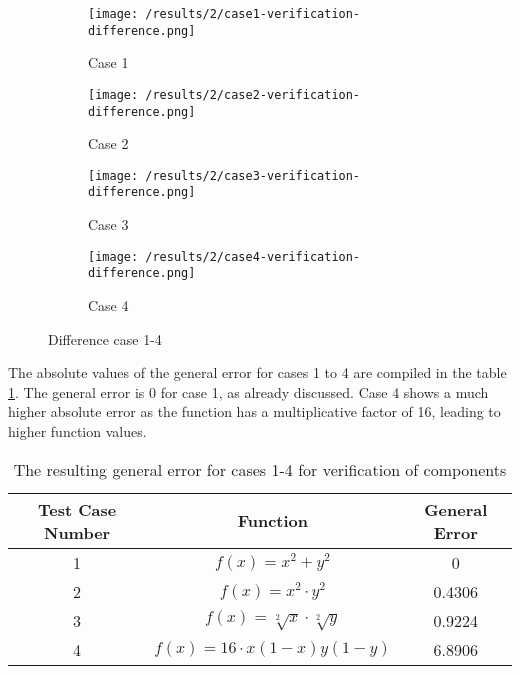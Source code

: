 \begin{figure}[h!]
	\centering
    \begin{subfigure}[b]{0.49\textwidth}
	    \texttt{[image: /results/2/case1-verification-difference.png]}
		\centering
        \label{fig:results2case1Diff}
        \caption{Case 1}
    \end{subfigure} 
    \begin{subfigure}[b]{0.49\textwidth}    
	    \texttt{[image: /results/2/case2-verification-difference.png]}
		\centering    
	 \caption{Case 2}
	    \label{fig:results2case2Diff}	 	 
    \end{subfigure} 
    \begin{subfigure}[b]{0.49\textwidth}
	    \texttt{[image: /results/2/case3-verification-difference.png]}
		\centering
        \label{fig:results2case3Diff}
        \caption{Case 3}
    \end{subfigure} 
    \begin{subfigure}[b]{0.49\textwidth}    
	    \texttt{[image: /results/2/case4-verification-difference.png]}
		\centering    
	 \caption{Case 4}
	    \label{fig:results2case4Diff}	 	 
    \end{subfigure} 
    \caption{Difference case 1-4}
    \label{fig:results2case1-4Diff}
\end{figure}


The absolute values of the general error for cases 1 to 4 are compiled in the table \ref{table:GenError}. The general error is 0 for case 1, as already discussed. Case 4 shows a much higher absolute error as the function has a multiplicative factor of 16, leading to higher function values. 

\begin{table}[h]
\centering
\label{table:GenError}
\caption{The resulting general error for cases 1-4 for verification of components}
\vspace{1em}
\begin{tabular}{| c | c | c |}
\hline
 Test Case Number & Function &  General Error\\
 \hline
 1 & $f(x)=x^2+y^2$ & 0 \\
 \hline
 2 & $f(x)=x^2 \cdot y^2 $ & 0.4306\\
 \hline
 3 & $f(x)=\sqrt[2]{x} \cdot \sqrt[2]{y}$ & 0.9224\\
 \hline
 4 & $f(x)=16 \cdot x(1-x)y(1-y)$ & 6.8906 \\
 \hline
\end{tabular}
\end{table}

